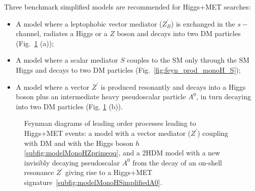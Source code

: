 Three benchmark simplified models \cite{Carpenter:2013xra,Berlin:2014cfa} 
are recommended for Higgs+MET searches:
\begin{itemize}
	\item A model where a leptophobic vector mediator ($Z_B^\prime$) is exchanged in the $s-$channel, 
	radiates a Higgs or a $Z$ boson and decays into two DM particles (Fig.~\ref{fig:feyn_prod_monoH} (a));
	\item A model where a scalar mediator $S$ couples to the SM only 
	through the SM Higgs and decays to two DM particles (Fig.~\ref{fig:feyn_prod_monoH_S});
	\item A model where a vector $Z^\prime$ is produced resonantly and decays into a Higgs boson
	plus an intermediate heavy pseudoscalar particle $A^0$, in turn decaying into two DM particles (Fig. \ref{fig:feyn_prod_monoH} (b)). 
\end{itemize}

\begin{figure}[!h!tpd]
	\centering
	\textwidth
	\caption
	{
		Feynman diagrams of leading order processes leading to Higgs+MET events: a model with a vector mediator ($Z^\prime$) 
		coupling with DM and with the Higgs boson $h$ \ref{subfig:modelMonoHZprimeqq}, and
		a 2HDM model with a new invisibly decaying pseudoscalar $A^0$ 
		from the decay of an on-shell resonance $Z^\prime$ giving rise to a Higgs+MET signature~\ref{subfig:modelMonoHSimplifiedA0}.
	}
	\label{fig:feyn_prod_monoH}
\end{figure}
		
